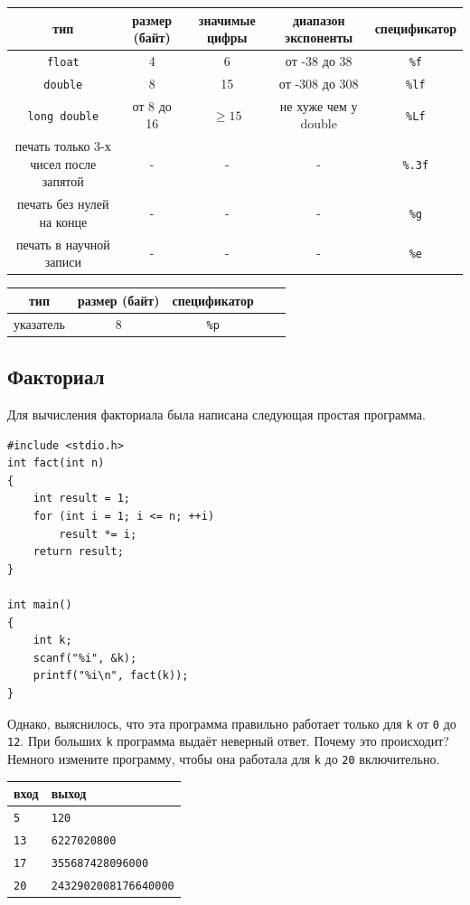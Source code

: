 \documentclass[10pt]{article}
\begin{document}
\begin{center}
\begin{tabular}{ c c c c c }
 тип & размер (байт) & значимые цифры & диапазон экспоненты & спецификатор \\ \hline
 \texttt{float}             & 4          & 6  & от -38 до 38    & \texttt{\%f} \\ 
 \texttt{double}            & 8          & 15 & от -308 до 308  & \texttt{\%lf}  \\  
 \texttt{long double}       & от 8 до 16 & $\ge 15$  & не хуже чем у double  & \texttt{\%Lf}  \\ \hline
 печать только 3-х чисел после запятой & -          & -  & -              & \texttt{\%.3f} \\
 печать без нулей на конце & -          & -  & -              & \texttt{\%g} \\
 печать в научной записи   & -          & -  & -              & \texttt{\%e} \\\hline
\end{tabular}
\end{center}

\begin{center}
\begin{tabular}{ c c c c c }
 тип & размер (байт)  & спецификатор \\ \hline
 указатель             & 8           & \texttt{\%p} \\ 
\end{tabular}
\end{center}

\subsection{Факториал}
Для вычисления факториала была написана следующая простая программа. 
\begin{lstlisting}
#include <stdio.h>
int fact(int n) 
{
    int result = 1;
    for (int i = 1; i <= n; ++i)
        result *= i;
    return result;
}

int main() 
{
    int k;
    scanf("%i", &k);
    printf("%i\n", fact(k));
}
\end{lstlisting}
Однако, выяснилось, что эта программа правильно работает только для \texttt{k} от \texttt{0} до \texttt{12}. При больших \texttt{k} программа выдаёт неверный ответ. Почему это происходит?
Немного измените программу, чтобы она работала для \texttt{k} до \texttt{20} включительно.

\begin{center}
\begin{tabular}{ l l }
 вход & выход \\ \hline
 \texttt{5} & \texttt{120}  \\ 
 \texttt{13} & \texttt{6227020800} \\
 \texttt{17} & \texttt{355687428096000} \\
 \texttt{20} & \texttt{2432902008176640000} \\
\end{tabular}
\end{center}
\end{document}
